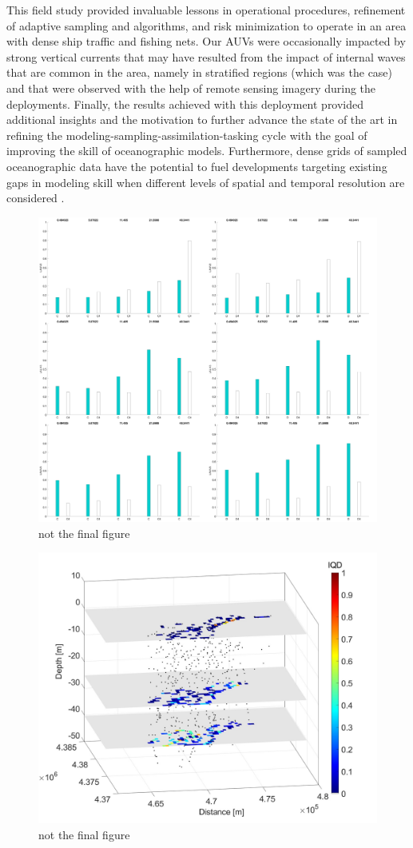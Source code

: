 This field study provided invaluable lessons in operational procedures,
refinement of adaptive sampling and algorithms, and risk minimization to
operate in an area with dense ship traffic and fishing nets. Our AUVs
were occasionally impacted by strong vertical currents that may have
resulted from the impact of internal waves that are common in the area,
namely in stratified regions (which was the case) and that were observed
with the help of remote sensing imagery during the deployments. Finally,
the results achieved with this deployment provided additional insights
and the motivation to further advance the state of the art in refining
the modeling-sampling-assimilation-tasking cycle with the goal of
improving the skill of oceanographic models. Furthermore, dense grids of
sampled oceanographic data have the potential to fuel developments
targeting existing gaps in modeling skill when different levels of
spatial and temporal resolution are considered \cite{Balaji_2022}.
\begin{figure}[!]
  \centering
  \includegraphics[scale=0.3]{fig/rms_bar_vechicle.png}
  \caption{not the final figure}
  \label{fig:rms_bar_vechicle}
\end{figure}

\begin{figure}[!]
  \centering
  \includegraphics[scale=0.3]{fig/iqd_3D.jpeg}
  \caption{not the final figure}
  \label{fig:iqd_3D}
\end{figure}


